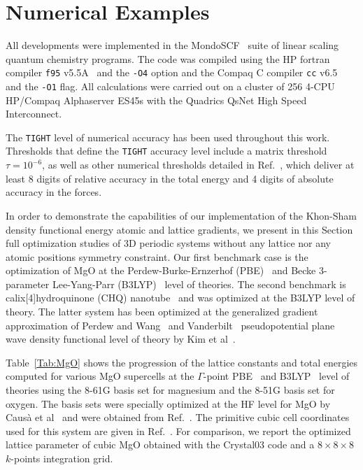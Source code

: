 \documentclass[prl,twocolumn,showpacs,twocolumngrid,superbib]{revtex4}
\begin{document}
\section{Numerical Examples}\label{Sec:NumExamples}
All developments were implemented in the {\sc MondoSCF}~\cite{MondoSCF} suite of
linear scaling quantum chemistry programs. 
The code was compiled using the HP fortran compiler {\tt f95} 
v5.5A~\cite{f95-v5.5a} and the {\tt -O4} option and the Compaq 
C compiler {\tt cc} v6.5~\cite{cc-v6.5} and the {\tt -O1} flag.
All calculations were carried out on a cluster of 256 4-CPU HP/Compaq 
Alphaserver ES45s with the Quadrics QsNet High Speed Interconnect.

The {\tt TIGHT} level of numerical accuracy has been used throughout this work.  
Thresholds that define the {\tt TIGHT} accuracy level include a matrix 
threshold $\tau=10^{-6}$, as well as other numerical thresholds 
detailed in Ref.~\cite{CTymczak04a}, which deliver at least 8 digits of 
relative accuracy in the total energy and 4 digits of absolute accuracy 
in the forces. 

In order to demonstrate the capabilities of our implementation of the
Khon-Sham density functional energy atomic and lattice gradients, we present in this Section
full optimization studies of 3D periodic systems without any lattice
nor any atomic positions symmetry constraint.
Our first benchmark case is the optimization of MgO at the Perdew-Burke-Ernzerhof (PBE)~\cite{Perdew_96v77} 
and Becke 3-parameter Lee-Yang-Parr (B3LYP)~\cite{ABecke93} 
level of theories. The second benchmark is calix[4]hydroquinone 
(CHQ) nanotube~\cite{KKim02} and was optimized at the B3LYP level of theory. 
The latter system has been optimized at the generalized gradient 
approximation of Perdew and Wang~\cite{YWang91} and 
Vanderbilt~\cite{DVanderbilt90} pseudopotential plane wave 
density functional level of theory by Kim et al~\cite{KKim02}.

Table~\ref{Tab:MgO} shows the progression of the lattice constants and total energies computed
for various MgO supercells at the $\Gamma$-point PBE~\cite{Perdew_96v77} 
and B3LYP~\cite{ABecke93} level of theories using
the 8-61G basis set for magnesium and the 8-51G basis set for oxygen.
The basis sets were specially optimized at the HF level for MgO by
Caus\`a et al~\cite{CBS:861G:MgO} and were obtained from Ref.~\cite{CrystalLib}.
The primitive cubic cell coordinates used for this system are given in
Ref.~\cite{PBCCoordinates}.
For comparison, we report the optimized lattice parameter of cubic MgO
obtained with the {\sc Crystal03} code and a $8\times 8\times 8$ $k$-points integration grid.
\end{document}
